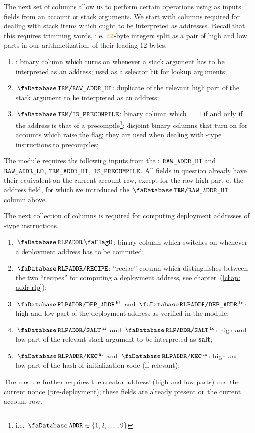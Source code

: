 The next set of columns allow us to perform certain operations using as inputs fields from an account or stack arguments.
We start with columns required for dealing with stack items which ought to be interpreted as addresses.
Recall that this requires trimming \evm{} words, i.e. $\evmWordSize$-byte integers split as a pair of high and low parts in our arithmetization,
of their leading $12$ bytes.
\begin{enumerate}[resume]
	\item \accTrmFlag: binary column which turns on whenever a stack argument has to be interpreted as an address; used as a selector bit for lookup arguments;
	\item $\accTrmRawAddrHi$: duplicate of the relevant high part of the stack argument to be interpreted as an address;
	\item $\accTrmIsPrecompile$:
		binary column which $=1$ if and only if the address is that of a precompile\footnote{i.e. $\accAddress \in \{1, 2, \dots, 9 \}$};
		disjoint binary columns that turn on for accounts which raise the \accTrmIsPrecompile{} flag; they are used when dealing with -type instructions to precompiles;
\end{enumerate}
\saNote{}
The \trmMod{} module requires the following inputs from the \hubMod{}:
$\texttt{RAW\_ADDR\_HI}$ and $\texttt{RAW\_ADDR\_LO}$,
$\texttt{TRM}\texttt{\_}\texttt{ADDR}\texttt{\_HI}$,
$\texttt{IS\_PRECOMPILE}$.
All fields in question already have their equivalent on the current account row, except for the raw high part of the address field, for which we introduced the $\accTrmRawAddrHi$ column above.

The next collection of columns is required for computing deployment addresses of -type instructions.
\begin{enumerate}[resume]
	\item $\accRlpAddrFlag$:
		binary column which switches on whenever a deployment address has to be computed;
	\item $\accRlpAddrRecipe$:
		``recipe'' column which distinguishes between the two ``recipes'' for computing a deployment address, see chapter~(\ref{chap: addr rlp});
	\item $\accRlpAddrDepAddrHi$ and $\accRlpAddrDepAddrLo$:
		high and low part of the deployment address as verified in the \rlpAddrMod{} module;
	\item $\accRlpAddrSaltHi$ and $\accRlpAddrSaltLo$:
		high and low part of the relevant stack argument to be interpreted as \textbf{salt}; 
	\item $\accRlpAddrKecHi$ and $\accRlpAddrKecLo$:
		high and low part of the hash of initialization code (if relevant);
\end{enumerate}
\saNote{}
The \rlpAddrMod{} module further requires the creator address' (high and low parts) and the current nonce (pre-deployment); these fields are already present on the current account row.

